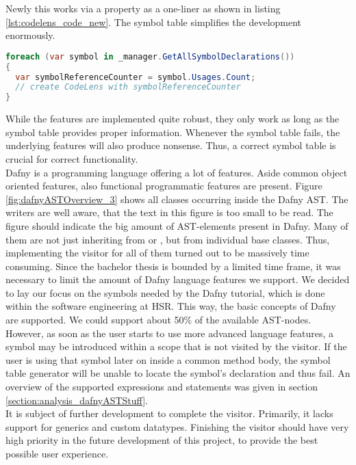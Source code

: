 Newly this works via a property as a one-liner as shown in listing \ref{lst:codelens_code_new}.
The symbol table simplifies the development enormously.

\begin{lstlisting}[language=csharp, caption={Example for CodeLens With the new Symbol Table}, captionpos=b, label={lst:codelens_code_new}]
foreach (var symbol in _manager.GetAllSymbolDeclarations())
{
  var symbolReferenceCounter = symbol.Usages.Count;
  // create CodeLens with symbolReferenceCounter
}
\end{lstlisting}

While the features are implemented quite robust, they only work as long as the symbol table provides proper information.
Whenever the symbol table fails, the underlying features will also produce nonsense.
Thus, a correct symbol table is crucial for correct functionality.\\

Dafny is a programming language offering a lot of features.
Aside common object oriented features, also functional programmatic features are present.
Figure \ref{fig:dafnyASTOverview_3} shows all classes occurring inside the Dafny AST.
The writers are well aware, that the text in this figure is too small to be read.
The figure should indicate the big amount of AST-elements present in Dafny.
Many of them are not just inheriting from  or , but from individual base classes.
Thus, implementing the visitor for all of them turned out to be massively time consuming.
Since the bachelor thesis is bounded by a limited time frame, it was necessary to limit the amount of Dafny language features we support.
We decided to lay our focus on the symbols needed by the Dafny tutorial, which is done within the software engineering at HSR.
This way, the basic concepts of Dafny are supported.
We could support about 50\% of the available AST-nodes.
However, as soon as the user starts to use more advanced language features, a symbol may be introduced within a scope that is not visited by the visitor.
If the user is using that symbol later on inside a common method body, the symbol table generator will be unable to locate the symbol's declaration and thus fail.
An overview of the supported expressions and statements was given in section \ref{section:analysis_dafnyASTStuff}.\\

It is subject of further development to complete the visitor.
Primarily, it lacks support for generics and custom datatypes.
Finishing the visitor should have very high priority in the future development of this project,
to provide the best possible user experience.

